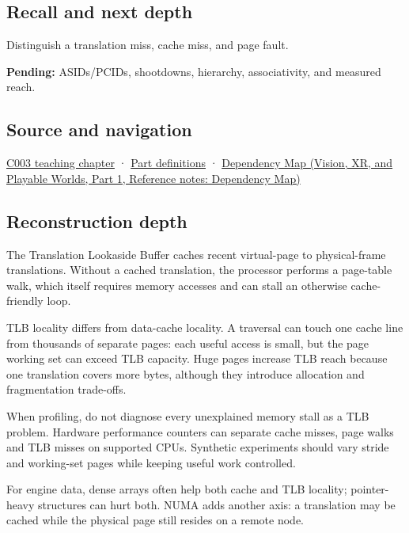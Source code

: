 \subsection{Recall and next depth}\label{appendix-7a2d9c5ce511-recall-and-next-depth}

\hypertarget{appendix-7a2d9c5ce511-recall-and-next-depth}{}

Distinguish a translation miss, cache miss, and page fault.

\textbf{Pending:} ASIDs/PCIDs, shootdowns, hierarchy, associativity, and measured reach.

\subsection{Source and navigation}\label{appendix-7a2d9c5ce511-source-and-navigation}

\hypertarget{appendix-7a2d9c5ce511-source-and-navigation}{}

\hyperref[01-foundations-i-ch002-where-the-bytes-live]{C003 teaching chapter} · \hyperref[appendix-fd090d982a15-m003---parts-41-60]{Part definitions} · \href{../07-Vision-XR-and-Playable-Worlds-P01/main.pdf\#nameddest=appendix-4ad47bdd269a}{Dependency Map (Vision, XR, and Playable Worlds, Part 1, Reference notes: Dependency Map)}

\subsection{Reconstruction depth}\label{appendix-7a2d9c5ce511-reconstruction-depth}

\hypertarget{appendix-7a2d9c5ce511-reconstruction-depth}{}

The Translation Lookaside Buffer caches recent virtual-page to physical-frame translations. Without a cached translation, the processor performs a page-table walk, which itself requires memory accesses and can stall an otherwise cache-friendly loop.

TLB locality differs from data-cache locality. A traversal can touch one cache line from thousands of separate pages: each useful access is small, but the page working set can exceed TLB capacity. Huge pages increase TLB reach because one translation covers more bytes, although they introduce allocation and fragmentation trade-offs.

When profiling, do not diagnose every unexplained memory stall as a TLB problem. Hardware performance counters can separate cache misses, page walks and TLB misses on supported CPUs. Synthetic experiments should vary stride and working-set pages while keeping useful work controlled.

For engine data, dense arrays often help both cache and TLB locality; pointer-heavy structures can hurt both. NUMA adds another axis: a translation may be cached while the physical page still resides on a remote node.
